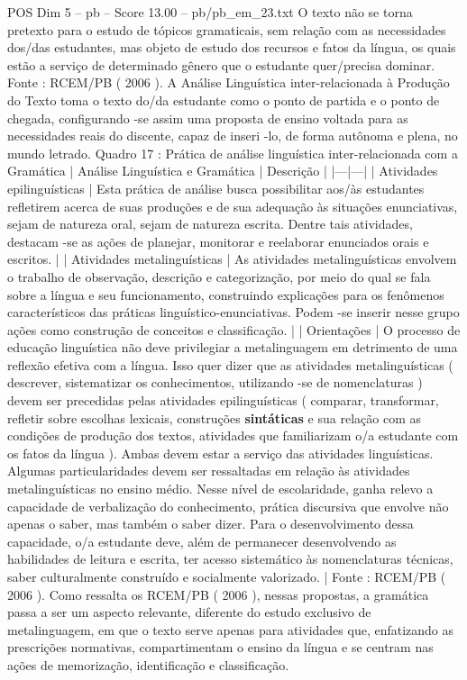 \begin{textsample}{POS Dim 5 – pb – Score 13.00 – pb/pb\_em\_23.txt}
O texto não se torna pretexto para o estudo de tópicos gramaticais, sem relação com as necessidades dos/das estudantes, mas objeto de estudo dos recursos e fatos da língua, os quais estão a serviço de determinado gênero que o estudante quer/precisa dominar.
Fonte : RCEM/PB ( 2006 ).
A Análise Linguística inter-relacionada à Produção do Texto toma o texto do/da estudante como o ponto de partida e o ponto de chegada, configurando -se assim uma proposta de ensino voltada para as necessidades reais do discente, capaz de inseri -lo, de forma autônoma e plena, no mundo letrado.
Quadro 17 : Prática de análise linguística inter-relacionada com a Gramática | Análise Linguística e Gramática | Descrição | |---|---| | Atividades epilinguísticas | Esta prática de análise busca possibilitar aos/às estudantes refletirem acerca de suas produções e de sua adequação às situações enunciativas, sejam de natureza oral, sejam de natureza escrita.
Dentre tais atividades, destacam -se as ações de planejar, monitorar e reelaborar enunciados orais e escritos. | | Atividades metalinguísticas | As atividades metalinguísticas envolvem o trabalho de observação, descrição e categorização, por meio do qual se fala sobre a língua e seu funcionamento, construindo explicações para os fenômenos característicos das práticas linguístico-enunciativas.
Podem -se inserir nesse grupo ações como construção de conceitos e classificação. | | Orientações | O processo de educação linguística não deve privilegiar a metalinguagem em detrimento de uma reflexão efetiva com a língua.
Isso quer dizer que as atividades metalinguísticas ( descrever, sistematizar os conhecimentos, utilizando -se de nomenclaturas ) devem ser precedidas pelas atividades epilinguísticas ( comparar, transformar, refletir sobre escolhas lexicais, construções \textbf{sintáticas} e sua relação com as condições de produção dos textos, atividades que familiarizam o/a estudante com os fatos da língua ).
Ambas devem estar a serviço das atividades linguísticas.
Algumas particularidades devem ser ressaltadas em relação às atividades metalinguísticas no ensino médio.
Nesse nível de escolaridade, ganha relevo a capacidade de verbalização do conhecimento, prática discursiva que envolve não apenas o saber, mas também o saber dizer.
Para o desenvolvimento dessa capacidade, o/a estudante deve, além de permanecer desenvolvendo as habilidades de leitura e escrita, ter acesso sistemático às nomenclaturas técnicas, saber culturalmente construído e socialmente valorizado. | Fonte : RCEM/PB ( 2006 ).
Como ressalta os RCEM/PB ( 2006 ), nessas propostas, a gramática passa a ser um aspecto relevante, diferente do estudo exclusivo de metalinguagem, em que o texto serve apenas para atividades que, enfatizando as prescrições normativas, compartimentam o ensino da língua e se centram nas ações de memorização, identificação e classificação.

\end{textsample}
